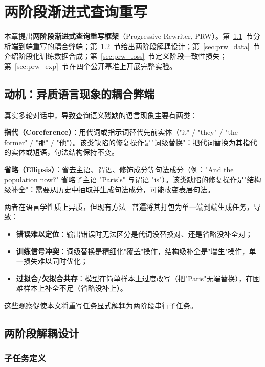 \chapter{两阶段渐进式查询重写}
\label{chap:prw}

本章提出\textbf{两阶段渐进式查询重写框架}（Progressive Rewriter, PRW）。第~\ref{sec:prw_motivation}~节分析端到端重写的耦合弊端；第~\ref{sec:prw_design}~节给出两阶段解耦设计；第~\ref{sec:prw_data}~节介绍阶段化训练数据合成；第~\ref{sec:prw_loss}~节定义阶段一致性损失；第~\ref{sec:prw_exp}~节在四个公开基准上开展完整实验。

\section{动机：异质语言现象的耦合弊端}
\label{sec:prw_motivation}

真实多轮对话中，导致查询语义残缺的语言现象主要有两类：

\textbf{指代（Coreference）}：用代词或指示词替代先前实体（"it" / "they" / "the former" / "那" / "他"）。该类缺陷的修复操作是"词级替换"：把代词替换为其指代的实体或短语，句法结构保持不变。

\textbf{省略（Ellipsis）}：省去主语、谓语、修饰成分等句法成分（例："And the population now?" 省略了主语 "Paris's" 与谓语 "is"）。该类缺陷的修复操作是"结构级补全"：需要从历史中抽取并生成句法成分，可能改变表层句法。

两者在语言学性质上异质，但现有方法~\citep{elgohary2019canyouunpack,lin2020conversational,vakulenko2021question} 普遍将其打包为单一端到端生成任务，导致：
\begin{itemize}
    \item \textbf{错误难以定位}：输出错误时无法区分是代词没替换对、还是省略没补全对；
    \item \textbf{训练信号冲突}：词级替换是精细化"覆盖"操作，结构级补全是"增生"操作，单一损失难以同时优化；
    \item \textbf{过拟合/欠拟合共存}：模型在简单样本上过度改写（把"Paris"无端替换），在困难样本上补全不足（省略没补上）。
\end{itemize}

这些观察促使本文将重写任务显式解耦为两阶段串行子任务。

\section{两阶段解耦设计}
\label{sec:prw_design}

\subsection{子任务定义}

